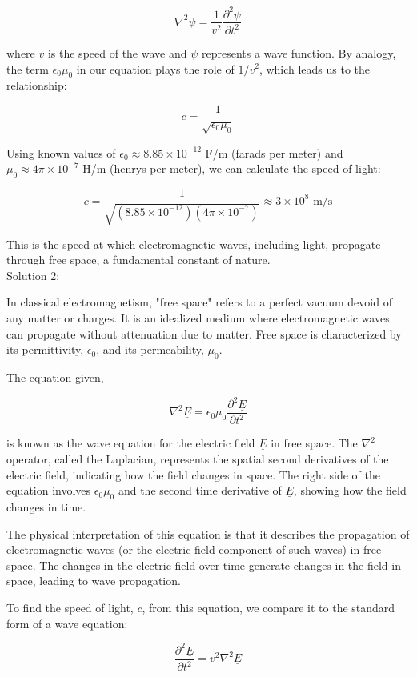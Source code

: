 \documentclass[a4paper,11pt]{article}
\begin{document}
\[
\nabla^{2}\psi = \frac{1}{v^2}\frac{\partial^2 \psi}{\partial t^{2}}
\]

where $v$ is the speed of the wave and $\psi$ represents a wave function. By analogy, the term $\epsilon_{0}\mu_{0}$ in our equation plays the role of $1/v^2$, which leads us to the relationship:

\[
c = \frac{1}{\sqrt{\epsilon_{0}\mu_{0}}}
\]

Using known values of $\epsilon_{0} \approx 8.85 \times 10^{-12}$ F/m (farads per meter) and $\mu_{0} \approx 4\pi \times 10^{-7}$ H/m (henrys per meter), we can calculate the speed of light:

\[
c = \frac{1}{\sqrt{(8.85 \times 10^{-12})(4\pi \times 10^{-7})}} \approx 3 \times 10^8 \text{ m/s}
\]

This is the speed at which electromagnetic waves, including light, propagate through free space, a fundamental constant of nature. \\ 

\noindent Solution 2:

In classical electromagnetism, "free space" refers to a perfect vacuum devoid of any matter or charges. It is an idealized medium where electromagnetic waves can propagate without attenuation due to matter. Free space is characterized by its permittivity, \(\epsilon_0\), and its permeability, \(\mu_0\).

The equation given,

\[
\nabla^{2}\underline{E} = \epsilon_{0}\mu_{0}\frac{\partial^2 \underline{E}}{\partial t^{2}}
\]

is known as the wave equation for the electric field \(\underline{E}\) in free space. The \(\nabla^{2}\) operator, called the Laplacian, represents the spatial second derivatives of the electric field, indicating how the field changes in space. The right side of the equation involves \(\epsilon_{0}\mu_{0}\) and the second time derivative of \(\underline{E}\), showing how the field changes in time.

The physical interpretation of this equation is that it describes the propagation of electromagnetic waves (or the electric field component of such waves) in free space. The changes in the electric field over time generate changes in the field in space, leading to wave propagation.

To find the speed of light, \(c\), from this equation, we compare it to the standard form of a wave equation:

\[
\frac{\partial^2 \underline{E}}{\partial t^{2}} = v^2 \nabla^{2}\underline{E}
\]
\end{document}

